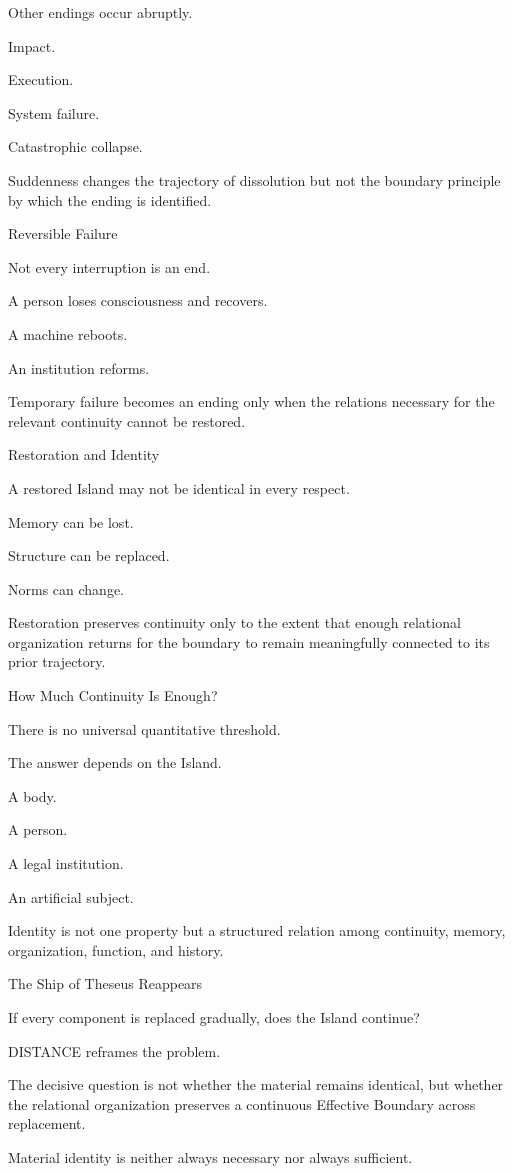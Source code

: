 Other endings occur abruptly.

Impact.

Execution.

System failure.

Catastrophic collapse.

Suddenness changes the trajectory of dissolution but not the boundary principle by which the ending is identified.

Reversible Failure

Not every interruption is an end.

A person loses consciousness and recovers.

A machine reboots.

An institution reforms.

Temporary failure becomes an ending only when the relations necessary for the relevant continuity cannot be restored.

Restoration and Identity

A restored Island may not be identical in every respect.

Memory can be lost.

Structure can be replaced.

Norms can change.

Restoration preserves continuity only to the extent that enough relational organization returns for the boundary to remain meaningfully connected to its prior trajectory.

How Much Continuity Is Enough?

There is no universal quantitative threshold.

The answer depends on the Island.

A body.

A person.

A legal institution.

An artificial subject.

Identity is not one property but a structured relation among continuity, memory, organization, function, and history.

The Ship of Theseus Reappears

If every component is replaced gradually, does the Island continue?

DISTANCE reframes the problem.

The decisive question is not whether the material remains identical, but whether the relational organization preserves a continuous Effective Boundary across replacement.

Material identity is neither always necessary nor always sufficient.

